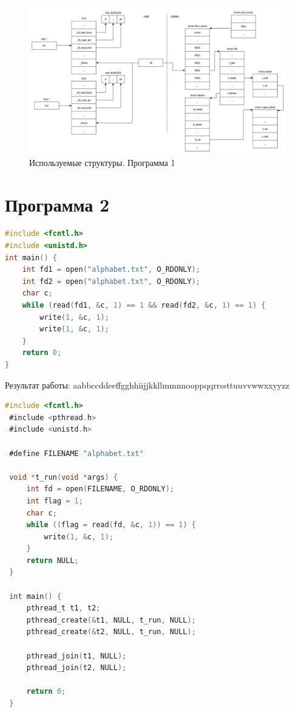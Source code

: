 \documentclass[12pt]{report}
\begin{document}
\begin{figure}[h!]
	\centering
	\includegraphics[scale=0.4]{1.png}
	\caption{Используемые структуры. Программа 1}
	\label{png:testing:result}
\end{figure}
\newpage

\section*{Программа 2}

\begin{lstlisting}[label=first,caption=Программа 2, language=C]
#include <fcntl.h>
#include <unistd.h>
int main() {
	int fd1 = open("alphabet.txt", O_RDONLY);
	int fd2 = open("alphabet.txt", O_RDONLY);
	char c;
	while (read(fd1, &c, 1) == 1 && read(fd2, &c, 1) == 1) {
		write(1, &c, 1);
		write(1, &c, 1);
	}
	return 0;
}
\end{lstlisting}

Результат работы: aabbccddeeffgghhiijjkkllmmnnooppqqrrssttuuvvwwxxyyzz

\begin{lstlisting}[label=first,caption=Программа 2 (многопоточная), language=C]
#include <fcntl.h> 
 #include <pthread.h> 
 #include <unistd.h> 
  
 #define FILENAME "alphabet.txt" 
  
 void *t_run(void *args) { 
     int fd = open(FILENAME, O_RDONLY); 
     int flag = 1; 
     char c; 
     while ((flag = read(fd, &c, 1)) == 1) { 
         write(1, &c, 1); 
     } 
     return NULL; 
 } 
  
 int main() { 
     pthread_t t1, t2; 
     pthread_create(&t1, NULL, t_run, NULL); 
     pthread_create(&t2, NULL, t_run, NULL); 
  
     pthread_join(t1, NULL); 
     pthread_join(t2, NULL); 
  
     return 0; 
 }
\end{lstlisting}
\end{document}
